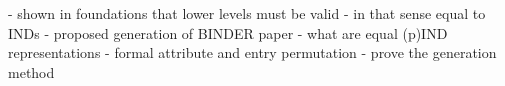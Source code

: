 - shown in foundations that lower levels must be valid
- in that sense equal to INDs
- proposed generation of BINDER paper
- what are equal (p)IND representations
 - formal attribute and entry permutation
- prove the generation method